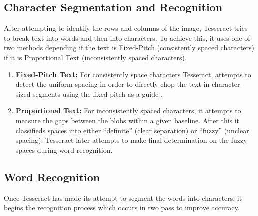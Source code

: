 \documentclass[10pt,twocolumn]{article}
\begin{document}
\subsection{Character Segmentation and Recognition}
After attempting to identify the rows and columns of the image, Tesseract tries to break text into words and then into characters. To achieve this, it uses one of two methods depending if the text is Fixed-Pitch (consistently spaced characters) if it is Proportional Text (inconsistently spaced characters).
\begin{enumerate}
    \item \textbf{Fixed-Pitch Text:} For consistently space characters Tesseract, attempts to detect the uniform spacing in order to directly chop the text in character-sized segments using the fixed pitch as a guide \cite{Overview_Smith}\cite{Overview_Akhil}.

    \item \textbf{Proportional Text:} For inconsistently spaced characters, it attempts to measure the gaps between the blobs within a given baseline. After this it classifieds spaces into either “definite” (clear separation) or “fuzzy” (unclear spacing). Tesseract later attempts to make final determination on the fuzzy spaces during word recognition\cite{Overview_Smith}\cite{Overview_Akhil}.
    
\end{enumerate}

\subsection{Word Recognition}
Once Tesseract has made its attempt to segment the words into characters, it begins the recognition process which occurs in two pass to improve accuracy.
\end{document}
